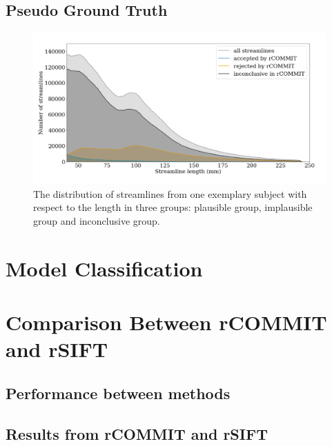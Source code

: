\subsection{Pseudo Ground Truth}

\begin{figure}[ht]
    \centering
    \includegraphics[width= 15cm]{figures/three_groups_hist.png}
        \caption{The distribution of streamlines from one exemplary subject with respect to the length in three groups: plausible group, implausible group and inconclusive group. }
    \label{fig:threegroup}
\end{figure}

\section{Model Classification}

\section{Comparison Between rCOMMIT and rSIFT}

\subsection{Performance between methods}

\subsection{Results from rCOMMIT and rSIFT}

